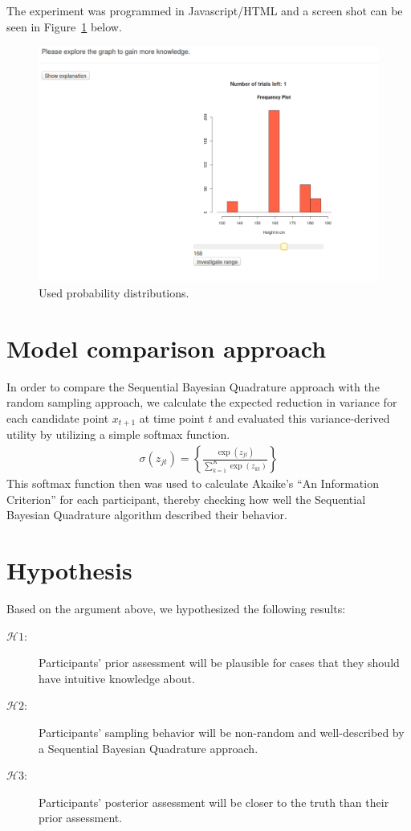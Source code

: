 \documentclass[oneside, 11pt]{book}
\begin{document}
The experiment was programmed in Javascript/HTML and a screen shot can be seen in Figure~\ref{screenshot} below.
\begin{figure}[h!]
\caption{Used probability distributions.}
\label{screenshot}
  \centering
    \includegraphics[scale=0.5]{screenshot.png}
\end{figure}
\section{Model comparison approach}
In order to compare the Sequential Bayesian Quadrature approach with the random sampling approach, we calculate the expected reduction in variance for each candidate point $x_{t+1}$ at time point $t$ and evaluated this variance-derived utility by utilizing a simple softmax function.
\begin{align}
\label{softmax}
\sigma(z_{jt}) = \left\{\frac{\exp(z_{jt})}{\sum_{k=1}^{K}\exp(z_{kt})}\right\}
\end{align}
This softmax function then was used to calculate Akaike's ``An Information Criterion'' for each participant, thereby checking how well the Sequential Bayesian Quadrature algorithm described their behavior.
\section{Hypothesis}
Based on the argument above, we hypothesized the following results:
\begin{description}
\item[$\mathcal{H}1$:] Participants' prior assessment will be plausible for cases that they should have intuitive knowledge about.
\item[$\mathcal{H}2$:] Participants' sampling behavior will be non-random and well-described by a Sequential Bayesian Quadrature approach.
\item[$\mathcal{H}3$:]  Participants' posterior assessment will be closer to the truth than their prior assessment. 
\end{description}
\end{document}
